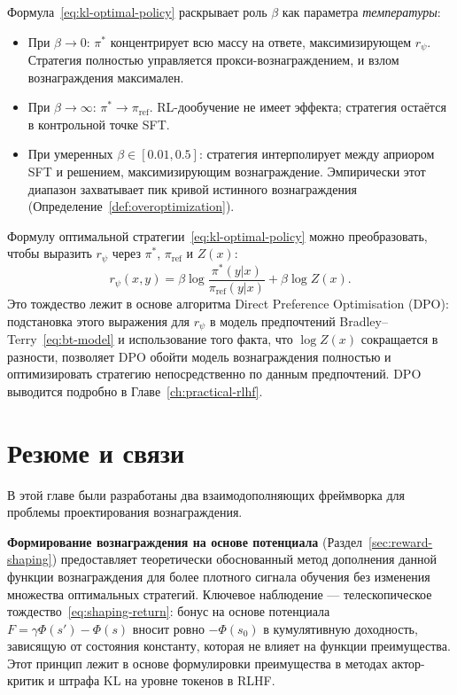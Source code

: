 Формула~\eqref{eq:kl-optimal-policy} раскрывает роль $\beta$ как параметра \emph{температуры}:
\begin{itemize}[leftmargin=*]
  \item При $\beta \to 0$: $\pi^*$ концентрирует всю массу на ответе, максимизирующем $r_\psi$. Стратегия полностью управляется прокси-вознаграждением, и взлом вознаграждения максимален.
  \item При $\beta \to \infty$: $\pi^* \to \pi_{\mathrm{ref}}$. RL-дообучение не имеет эффекта; стратегия остаётся в контрольной точке SFT.
  \item При умеренных $\beta \in [0.01, 0.5]$: стратегия интерполирует между априором SFT и решением, максимизирующим вознаграждение. Эмпирически этот диапазон захватывает пик кривой истинного вознаграждения (Определение~\ref{def:overoptimization}).
\end{itemize}

\begin{remark}
\label{rem:dpo-connection}
Формулу оптимальной стратегии~\eqref{eq:kl-optimal-policy} можно преобразовать, чтобы выразить $r_\psi$ через $\pi^*$, $\pi_{\mathrm{ref}}$ и $Z(x)$:
\[
r_\psi(x, y) = \beta\log\frac{\pi^*(y|x)}{\pi_{\mathrm{ref}}(y|x)} + \beta\log Z(x).
\]
Это тождество лежит в основе алгоритма Direct Preference Optimisation (DPO): подстановка этого выражения для $r_\psi$ в модель предпочтений Bradley--Terry~\eqref{eq:bt-model} и использование того факта, что $\log Z(x)$ сокращается в разности, позволяет DPO обойти модель вознаграждения полностью и оптимизировать стратегию непосредственно по данным предпочтений. DPO выводится подробно в Главе~\ref{ch:practical-rlhf}.
\end{remark}

\section{Резюме и связи}
\label{sec:ch10-summary}

В этой главе были разработаны два взаимодополняющих фреймворка для проблемы проектирования вознаграждения.

\textbf{Формирование вознаграждения на основе потенциала} (Раздел~\ref{sec:reward-shaping}) предоставляет теоретически обоснованный метод дополнения данной функции вознаграждения для более плотного сигнала обучения без изменения множества оптимальных стратегий. Ключевое наблюдение --- телескопическое тождество~\eqref{eq:shaping-return}: бонус на основе потенциала $F = \gamma\Phi(s') - \Phi(s)$ вносит ровно $-\Phi(s_0)$ в кумулятивную доходность, зависящую от состояния константу, которая не влияет на функции преимущества. Этот принцип лежит в основе формулировки преимущества в методах актор-критик и штрафа KL на уровне токенов в RLHF.

